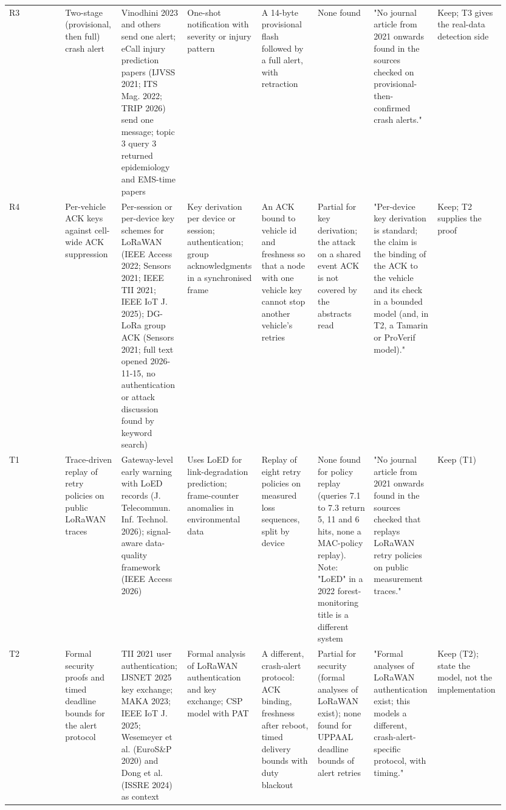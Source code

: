 {\begin{longtable}{p{0.119\linewidth}p{0.119\linewidth}p{0.119\linewidth}p{0.119\linewidth}p{0.119\linewidth}p{0.119\linewidth}p{0.119\linewidth}p{0.119\linewidth}}
R3 & Two-stage (provisional, then full) crash alert & Vinodhini 2023 and others send one alert; eCall injury prediction papers (IJVSS 2021; ITS Mag. 2022; TRIP 2026) send one message; topic 3 query 3 returned epidemiology and EMS-time papers & One-shot notification with severity or injury pattern & A 14-byte provisional flash followed by a full alert, with retraction & None found & "No journal article from 2021 onwards found in the sources checked on provisional-then-confirmed crash alerts." & Keep; T3 gives the real-data detection side \\
R4 & Per-vehicle ACK keys against cell-wide ACK suppression & Per-session or per-device key schemes for LoRaWAN (IEEE Access 2022; Sensors 2021; IEEE TII 2021; IEEE IoT J. 2025); DG-LoRa group ACK (Sensors 2021; full text opened 2026-11-15, no authentication or attack discussion found by keyword search) & Key derivation per device or session; authentication; group acknowledgments in a synchronised frame & An ACK bound to vehicle id and freshness so that a node with one vehicle key cannot stop another vehicle's retries & Partial for key derivation; the attack on a shared event ACK is not covered by the abstracts read & "Per-device key derivation is standard; the claim is the binding of the ACK to the vehicle and its check in a bounded model (and, in T2, a Tamarin or ProVerif model)." & Keep; T2 supplies the proof \\
T1 & Trace-driven replay of retry policies on public LoRaWAN traces & Gateway-level early warning with LoED records (J. Telecommun. Inf. Technol. 2026); signal-aware data-quality framework (IEEE Access 2026) & Uses LoED for link-degradation prediction; frame-counter anomalies in environmental data & Replay of eight retry policies on measured loss sequences, split by device & None found for policy replay (queries 7.1 to 7.3 return 5, 11 and 6 hits, none a MAC-policy replay). Note: "LoED" in a 2022 forest-monitoring title is a different system & "No journal article from 2021 onwards found in the sources checked that replays LoRaWAN retry policies on public measurement traces." & Keep (T1) \\
T2 & Formal security proofs and timed deadline bounds for the alert protocol & TII 2021 user authentication; IJSNET 2025 key exchange; MAKA 2023; IEEE IoT J. 2025; Wesemeyer et al. (EuroS\&P 2020) and Dong et al. (ISSRE 2024) as context & Formal analysis of LoRaWAN authentication and key exchange; CSP model with PAT & A different, crash-alert protocol: ACK binding, freshness after reboot, timed delivery bounds with duty blackout & Partial for security (formal analyses of LoRaWAN exist); none found for UPPAAL deadline bounds of alert retries & "Formal analyses of LoRaWAN authentication exist; this models a different, crash-alert-specific protocol, with timing." & Keep (T2); state the model, not the implementation \\

\end{longtable}}
